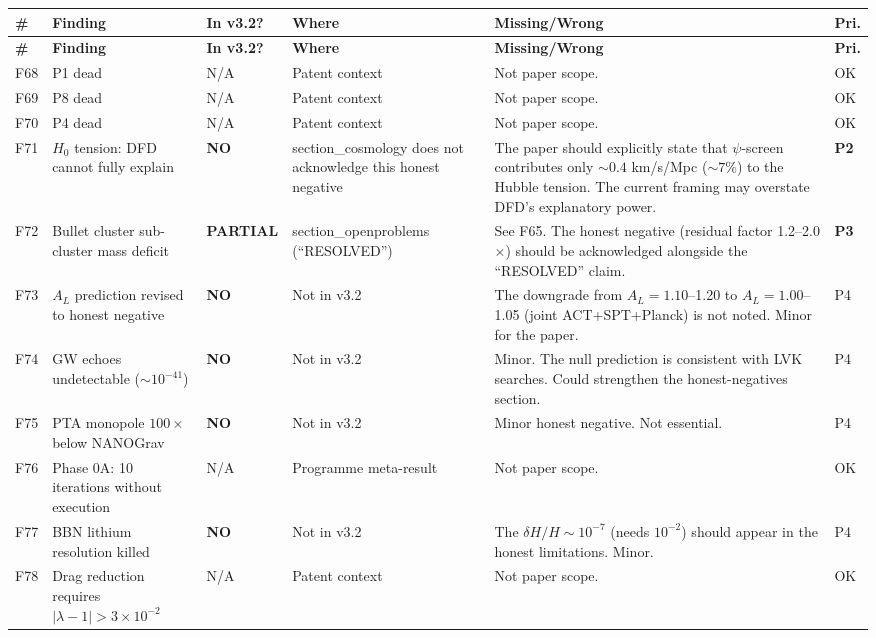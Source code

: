\documentclass[11pt,a4paper]{article}
\newcommand{\PARTIAL}{\textcolor{partial}{\textbf{PARTIAL}}}
\newcommand{\NO}{\textcolor{no}{\textbf{NO}}}
\begin{document}
\begin{longtable}{|p{0.5cm}|p{3.5cm}|p{1.2cm}|p{3.5cm}|p{4.5cm}|p{1cm}|}
\hline
\textbf{\#} & \textbf{Finding} & \textbf{In v3.2?} & \textbf{Where} & \textbf{Missing/Wrong} & \textbf{Pri.} \\
\hline
\endfirsthead
\hline
\textbf{\#} & \textbf{Finding} & \textbf{In v3.2?} & \textbf{Where} & \textbf{Missing/Wrong} & \textbf{Pri.} \\
\hline
\endhead

F68 & P1 dead &
N/A & Patent context & Not paper scope. & OK \\
\hline

F69 & P8 dead &
N/A & Patent context & Not paper scope. & OK \\
\hline

F70 & P4 dead &
N/A & Patent context & Not paper scope. & OK \\
\hline

F71 & $H_0$ tension: DFD cannot fully explain &
\NO &
section\_cosmology does not acknowledge this honest negative &
The paper should explicitly state that $\psi$-screen contributes only $\sim 0.4$ km/s/Mpc ($\sim 7\%$) to the Hubble tension. The current framing may overstate DFD's explanatory power. &
\textbf{P2} \\
\hline

F72 & Bullet cluster sub-cluster mass deficit &
\PARTIAL &
section\_openproblems (``RESOLVED'') &
See F65. The honest negative (residual factor 1.2--2.0$\times$) should be acknowledged alongside the ``RESOLVED'' claim. &
\textbf{P3} \\
\hline

F73 & $A_L$ prediction revised to honest negative &
\NO &
Not in v3.2 &
The downgrade from $A_L = 1.10$--1.20 to $A_L = 1.00$--1.05 (joint ACT+SPT+Planck) is not noted. Minor for the paper. &
P4 \\
\hline

F74 & GW echoes undetectable ($\sim 10^{-41}$) &
\NO &
Not in v3.2 &
Minor. The null prediction is consistent with LVK searches. Could strengthen the honest-negatives section. &
P4 \\
\hline

F75 & PTA monopole $100\times$ below NANOGrav &
\NO &
Not in v3.2 &
Minor honest negative. Not essential. &
P4 \\
\hline

F76 & Phase 0A: 10 iterations without execution &
N/A & Programme meta-result & Not paper scope. & OK \\
\hline

F77 & BBN lithium resolution killed &
\NO &
Not in v3.2 &
The $\delta H/H \sim 10^{-7}$ (needs $10^{-2}$) should appear in the honest limitations. Minor. &
P4 \\
\hline

F78 & Drag reduction requires $|\lambda-1| > 3 \times 10^{-2}$ &
N/A & Patent context & Not paper scope. & OK \\
\hline

\end{longtable}
\end{document}
